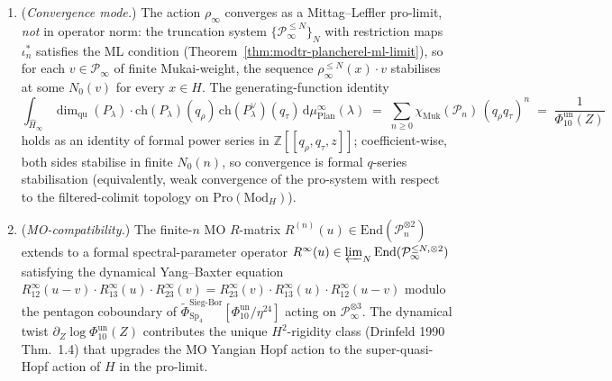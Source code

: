 \begin{theorem}
\begin{enumerate}[label=\textup{(\alph*)}]
\[\]
where $P_\lambda^{\leq N}$ is the $N$-truncation projective cover and
the quantum dimension is the Lyubashenko trace. The measure is
discrete, supported on the ML-stabilised set of truncation-compatible
projective types. Equivalently, $\mathrm d\mu_{\mathrm{Plan}}^\infty$
is the $T$-equivariant multiplicity of $P_\lambda$ in
$\mathcal P_\infty$.
\item (\emph{Convergence mode.}) The action $\rho_\infty$ converges as a
Mittag--Leffler pro-limit, \emph{not} in operator norm: the truncation
system $\{\mathcal P_\infty^{\leq N}\}_N$ with restriction maps
$\iota_n^*$ satisfies the ML condition
(Theorem~\ref{thm:modtr-plancherel-ml-limit}),
so for each $v \in \mathcal P_\infty$ of finite Mukai-weight, the
sequence $\rho_\infty^{\leq N}(x)\cdot v$ stabilises at some $N_0(v)$
for every $x \in H$. The generating-function identity
\begin{equation}
\label{eq:plan-hs-MO-convergence-equation}
 \int_{\widehat H_\infty}
 \dim_{\mathrm{qu}}(P_\lambda)\cdot
 \mathrm{ch}(P_\lambda)(q_\rho)\,\mathrm{ch}(P_\lambda^\vee)(q_\tau)\,
 \mathrm d\mu_{\mathrm{Plan}}^\infty(\lambda)
 \;=\;
 \sum_{n \geq 0}\chi_{\mathrm{Muk}}(\mathcal P_n)\,(q_\rho q_\tau)^n
 \;=\;
 \frac{1}{\Phi_{10}^{\mathrm{un}}(Z)}
\end{equation}
holds as an identity of formal power series in
$\mathbb Z[[q_\rho, q_\tau, z]]$; coefficient-wise, both sides stabilise
in finite $N_0(n)$, so convergence is formal $q$-series stabilisation
(equivalently, weak convergence of the pro-system with respect to the
filtered-colimit topology on $\mathrm{Pro}(\mathrm{Mod}_H)$).
\item (\emph{MO-compatibility.}) The finite-$n$ MO $R$-matrix
$R^{(n)}(u) \in \mathrm{End}(\mathcal P_n^{\otimes 2})$ extends to a
formal spectral-parameter operator
$R^\infty(u) \in \varprojlim_N \mathrm{End}(\mathcal P_\infty^{\leq N, \otimes 2})$
satisfying the dynamical Yang--Baxter equation
$R^\infty_{12}(u - v)\cdot R^\infty_{13}(u)\cdot R^\infty_{23}(v) =
 R^\infty_{23}(v)\cdot R^\infty_{13}(u)\cdot R^\infty_{12}(u - v)$
modulo the pentagon coboundary of
$\widetilde\Phi^{\mathrm{Sieg\text{-}Bor}}_{\mathrm{Sp}_4}[\Phi_{10}^{\mathrm{un}}/\eta^{24}]$
acting on $\mathcal P_\infty^{\otimes 3}$. The dynamical twist
$\partial_Z\log\Phi_{10}^{\mathrm{un}}(Z)$ contributes the unique $H^2$-rigidity
class (Drinfeld 1990 Thm.~1.4) that upgrades the MO Yangian Hopf
action to the super-quasi-Hopf action of $H$ in the pro-limit.
\end{enumerate}
\end{theorem}

